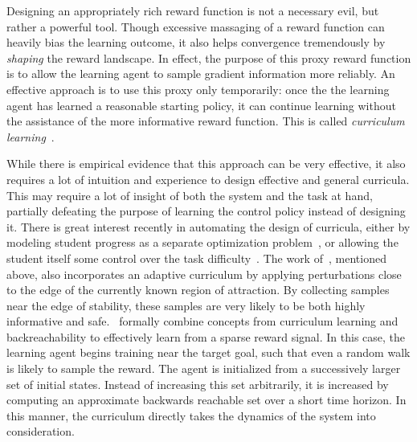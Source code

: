 Designing an appropriately rich reward function is not a necessary evil, but rather a powerful tool. Though excessive massaging of a reward function can heavily bias the learning outcome, it also helps convergence tremendously by \emph{shaping} the reward landscape. In effect, the purpose of this proxy reward function is to allow the learning agent to sample gradient information more reliably. An effective approach is to use this proxy only temporarily: once the the learning agent has learned a reasonable starting policy, it can continue learning without the assistance of the more informative reward function. This is called \emph{curriculum learning}~\cite{bengio2009curriculum,karpathy2012curriculum}. \par
While there is empirical evidence that this approach can be very effective, it also requires a lot of intuition and experience to design effective and general curricula. This may require a lot of insight of both the system and the task at hand, partially defeating the purpose of learning the control policy instead of designing it. There is great interest recently in automating the design of curricula, either by modeling student progress as a separate optimization problem~\cite{portelas2019teacher}, or allowing the student itself some control over the task difficulty~\cite{klink2019self}. The work of~\textcite{kumar2018improving}, mentioned above, also incorporates an adaptive curriculum  by applying perturbations close to the edge of the currently known region of attraction. By collecting samples near the edge of stability, these samples are very likely to be both highly informative and safe.~\textcite{ivanovic2019barc} formally combine concepts from curriculum learning and backreachability to effectively learn from a sparse reward signal. In this case, the learning agent begins training near the target goal, such that even a random walk is likely to sample the reward. The agent is initialized from a successively larger set of initial states. Instead of increasing this set arbitrarily, it is increased by computing an approximate backwards reachable set over a short time horizon. In this manner, the curriculum directly takes the dynamics of the system into consideration.

